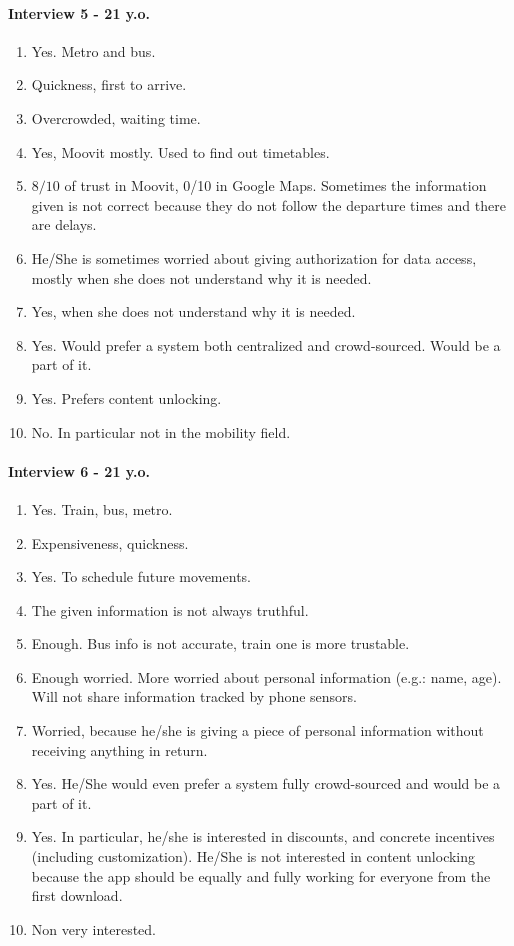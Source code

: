 \documentclass[a4paper, 10pt]{IEEEtran}
\begin{document}
\paragraph*{Interview 5 - 21 y.o.}
\begin{enumerate}
    \item Yes. Metro and bus.
    \item Quickness, first to arrive.
    \item Overcrowded, waiting time.
    \item Yes, Moovit mostly. Used to find out timetables.
    \item $8/10$ of trust in Moovit, 0/10 in Google Maps. Sometimes the information given is not correct because they do not follow the departure times and there are delays.
    \item He/She is sometimes worried about giving authorization for data access, mostly when she does not understand why it is needed.
    \item Yes, when she does not understand why it is needed.
    \item Yes. Would prefer a system both centralized and crowd-sourced. Would be a part of it.
    \item Yes. Prefers content unlocking.
    \item No. In particular not in the mobility field.
\end{enumerate}


\paragraph*{Interview 6 - 21 y.o.}
\begin{enumerate}
    \item Yes. Train, bus, metro.
    \item Expensiveness, quickness.
    \item Yes. To schedule future movements.
    \item The given information is not always truthful.
    \item Enough. Bus info is not accurate, train one is more trustable.
    \item Enough worried. More worried about personal information (e.g.: name, age). Will not share information tracked by phone sensors.
    \item Worried, because he/she is giving a piece of personal information without receiving anything in return.
    \item Yes. He/She would even prefer a system fully crowd-sourced and would be a part of it.
    \item Yes. In particular, he/she is interested in discounts, and concrete incentives (including customization). He/She is not interested in content unlocking because the app should be equally and fully working for everyone from the first download.
    \item Non very interested.
\end{enumerate}
\end{document}
